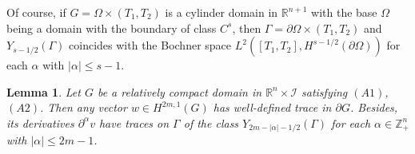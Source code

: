 \documentclass{amsart}
\newtheorem{lem}[thm]{Lemma}
\theoremstyle{definition}
\theoremstyle{remark}
\numberwithin{equation}{section}
\begin{document}
Of course, if $G = \Omega \times (T_1,T_2)$ is a cylinder domain in ${\mathbb R}^{n+1}$
with the base $\Omega$ being a domain with the boundary of class $C^{s}$, then 
$\Gamma = \partial \Omega \times (T_1, T_2)$ and $ Y_{s-1/2} (\Gamma) $ coincides with the Bochner space $L^2 ([T_1, T_2], H^{s-1/2} (\partial \Omega))$ for each 
$\alpha$ with $|\alpha|\leq s-1$.

\begin{lem} \label{l.trace.c0} Let $G$ be a relatively compact domain 
in ${\mathbb R}^n \times {\mathcal I}$ satisfying $(A1)$, $(A2)$. Then any vector 
$w \in {H}^{2m,1} (G)$  
has well-defined trace in $\partial G$. 
Besides, its derivatives  $\partial^\alpha v$ have traces 
on $\Gamma$ of the class $Y_{2m-|\alpha|-1/2} (\Gamma)$ 
for each $\alpha \in {\mathbb Z}^n_+$ with $|\alpha|\leq 2m-1$. 
\end{lem}
\end{document}
